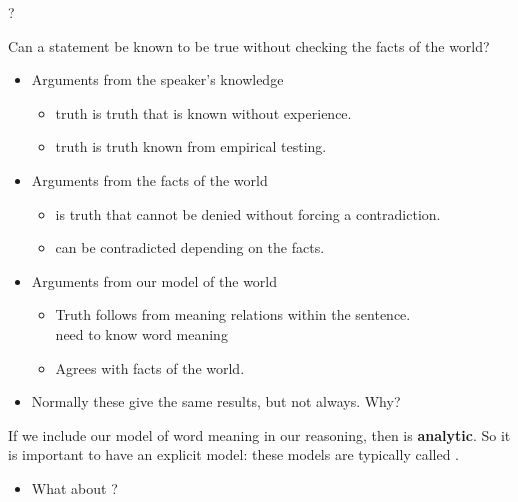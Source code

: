 \documentclass[headrule,footrule]{foils}
\begin{document}
\begin{exe}
  \ex {}
  \ex ?
\end{exe}

\noindent Can a statement be known to be true without checking the facts of the
world?

\begin{itemize}
\item Arguments from the speaker's knowledge
\begin{itemize}
\item {} truth is truth that is known without experience.
\item {} truth is truth known from empirical testing.
\end{itemize}
\item Arguments from the facts of the world
  \begin{itemize}
  \item {} is truth that cannot be denied without forcing a
    contradiction.
  \item {} can be contradicted depending on the facts.
  \end{itemize}
\item Arguments from our model of the world
\begin{itemize}
\item {} Truth follows from meaning relations  within the sentence.
\\ need to know word meaning
\item {} Agrees with facts of the world.
\end{itemize}
\item Normally these give the same results, but not always.  Why?
\end{itemize}

If we include our model of word meaning in our reasoning, then  is \textbf{analytic}.  So it is important to have
an explicit model: these models are typically called .

\begin{itemize}
\item What about ?
\end{itemize}
\end{document}
